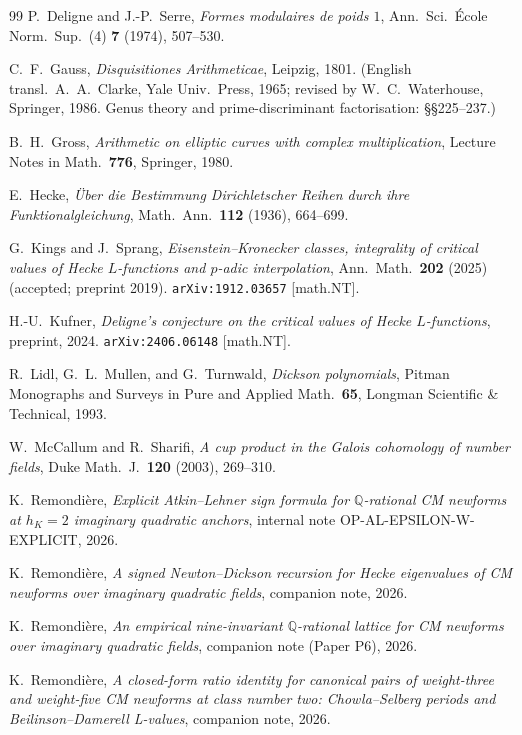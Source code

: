 \documentclass[11pt,a4paper]{amsart}
\theoremstyle{plain}
\theoremstyle{definition}
\newcommand{\Q}{\mathbb{Q}}
\begin{document}
\begin{thebibliography}{99}
P.~Deligne and J.-P.~Serre,
\textit{Formes modulaires de poids $1$},
Ann.\ Sci.\ \'Ecole Norm.\ Sup.\ (4) \textbf{7} (1974), 507--530.

C.~F.~Gauss,
\emph{Disquisitiones Arithmeticae},
Leipzig, 1801.
(English transl.\ A.~A.~Clarke, Yale Univ.\ Press, 1965;
revised by W.~C.~Waterhouse, Springer, 1986.
Genus theory and prime-discriminant factorisation: \S\S 225--237.)

B.~H.~Gross,
\emph{Arithmetic on elliptic curves with complex multiplication},
Lecture Notes in Math.\ \textbf{776}, Springer, 1980.

E.~Hecke,
\textit{\"Uber die Bestimmung Dirichletscher Reihen durch ihre
Funktionalgleichung},
Math.\ Ann.\ \textbf{112} (1936), 664--699.

G.~Kings and J.~Sprang,
\textit{Eisenstein--Kronecker classes, integrality of critical values of
Hecke $L$-functions and $p$-adic interpolation},
Ann.\ Math.\ \textbf{202} (2025) (accepted; preprint 2019).
\texttt{arXiv:1912.03657} [math.NT].

H.-U.~Kufner,
\textit{Deligne's conjecture on the critical values of Hecke
$L$-functions},
preprint, 2024.
\texttt{arXiv:2406.06148} [math.NT].

R.~Lidl, G.~L.~Mullen, and G.~Turnwald,
\emph{Dickson polynomials},
Pitman Monographs and Surveys in Pure and Applied Math.\ \textbf{65},
Longman Scientific \& Technical, 1993.

W.~McCallum and R.~Sharifi,
\textit{A cup product in the Galois cohomology of number fields},
Duke Math.\ J.\ \textbf{120} (2003), 269--310.

K.~Remondi\`ere,
\textit{Explicit Atkin--Lehner sign formula for $\Q$-rational CM
newforms at $h_K = 2$ imaginary quadratic anchors},
internal note OP-AL-EPSILON-W-EXPLICIT, 2026.

K.~Remondi\`ere,
\textit{A signed Newton--Dickson recursion for Hecke eigenvalues of
CM newforms over imaginary quadratic fields},
companion note, 2026.

K.~Remondi\`ere,
\textit{An empirical nine-invariant $\Q$-rational lattice for CM
newforms over imaginary quadratic fields},
companion note (Paper P6), 2026.

K.~Remondi\`ere,
\textit{A closed-form ratio identity for canonical pairs of weight-three
and weight-five CM newforms at class number two: Chowla--Selberg periods
and Beilinson--Damerell L-values},
companion note, 2026.


\end{thebibliography}
\end{document}
